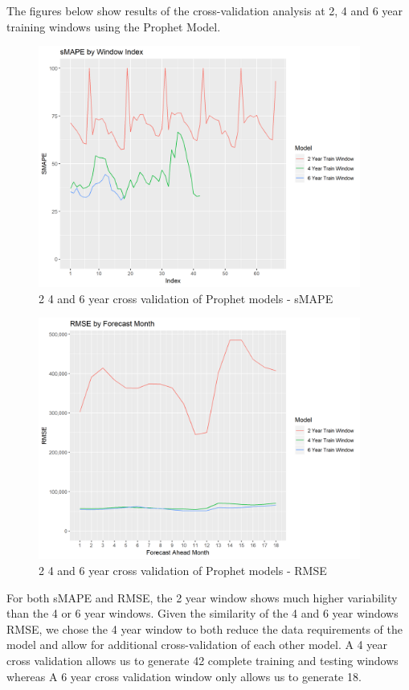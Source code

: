 \documentclass[12pt,oneside]{chicagocapstone}
\begin{document}
The figures below show results of the cross-validation analysis at 2, 4
and 6 year training windows using the Prophet Model.
\begin{figure}

{\centering \includegraphics[width=400px]{figure/Prophet_SMAPE_CV} 

}

\caption{2 4 and 6 year cross validation of Prophet models - sMAPE}\label{fig:croosvalrmse}
\end{figure}
\begin{figure}

{\centering \includegraphics[width=400px]{figure/Prophet_RMSE_CV} 

}

\caption{2 4 and 6 year cross validation of Prophet models - RMSE}\label{fig:crossvalrmse}
\end{figure}
For both sMAPE and RMSE, the 2 year window shows much higher variability
than the 4 or 6 year windows. Given the similarity of the 4 and 6 year
windows RMSE, we chose the 4 year window to both reduce the data
requirements of the model and allow for additional cross-validation of
each other model. A 4 year cross validation allows us to generate 42
complete training and testing windows whereas A 6 year cross validation
window only allows us to generate 18.
\end{document}
